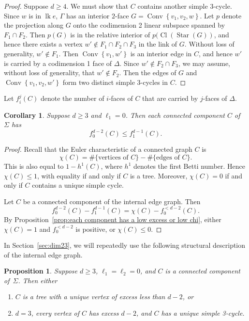 \documentclass[10pt]{amsart}
\newtheorem{prop}[theorem]{Proposition}
\newtheorem{coro}[theorem]{Corollary}
\DeclareMathOperator{\Cl}{Cl}
\DeclareMathOperator{\Convop}{Conv}
\newcommand{\Conv}[1]{\Convop\left\{{#1}\right\}}
\DeclareMathOperator{\lk}{lk}
\DeclareMathOperator{\Star}{Star}
\begin{document}
\begin{proof}
Suppose $d \geq 4$. We must show that $C$ contains another simple $3$-cycle. 
Since $w$ is in $\lk e$, $\Gamma$ has an interior $2$-face $G = \Conv{v_1,v_2, w}$. 
Let $p$ denote the projection along $G$ onto the codimension 2 linear subspace spanned by 
$F_1 \cap F_2$. Then $p(G)$ is in the relative interior of $p(\Cl(\Star(G))$, and hence 
there exists a vertex $w' \notin F_1 \cap F_2 \cap F_3$ in the link of $G$. Without loss 
of generality, $w' \notin F_1$. Then $\Conv{v_1, w'}$ is an interior edge in $C$, and 
hence $w'$ is carried by a codimension 1 face of $\Delta$. Since $w' \notin F_2 \cap F_3$, 
we may assume, without loss of generality, that $w' \notin F_2$. Then the edges of $G$ 
and $\Conv{v_1, v_2, w'}$ form two distinct simple $3$-cycles in $C$. 
\end{proof}

Let $f_i^j(C)$ denote the number of $i$-faces of $C$ that are carried by $j$-faces of 
$\Delta$.

\begin{coro} \label{cor:non-negative}
Suppose $d \geq 3$ and $\ell_1 = 0$. Then each connected component $C$ of $\Sigma$ has
\[
f_0^{d-2}(C) \leq f_1^{d-1}(C).
\]
\end{coro}

\begin{proof}
Recall that the Euler characteristic of a connected graph $C$ is 
\[
\chi(C) = \# \{ \mbox{vertices of $C$}\} - \#\{ \mbox{edges of $C$} \}.
\]
This is also equal to $1 - h^1(C)$, where $h^1$ denotes the first Betti number. Hence $\chi(C) \leq 1$, with equality if and only if $C$ is a tree. Moreover, $\chi(C) = 0$ if and only if $C$ contains a unique simple cycle.

Let $C$ be a connected component of the internal edge graph. Then $$f_0^{d-2}(C) - f_1^{d-1}(C) = \chi(C) - f_0^{< d-2}(C).$$ By Proposition~\ref{prop:each component has a low excess or low chi}, either $\chi(C) = 1$ and $f_0^{< d-2}$ is positive, or $\chi(C) \leq 0$.
\end{proof}


In Section~\ref{sec:dim23}, we will repeatedly use the following structural description of the internal edge graph.

\begin{prop}\label{prop:components are trees or have cycles}
Suppose $d \geq 3$, $\ell_1=\ell_2 = 0$, and $C$ is a connected component of~$\Sigma$. Then either
\begin{enumerate}
\item $C$ is a tree with a unique vertex of excess less than $d-2$, or
\item $d=3$, every vertex of $C$ has excess $d-2$, and $C$ has a unique simple 3-cycle.
\end{enumerate}
\end{prop}
\end{document}
